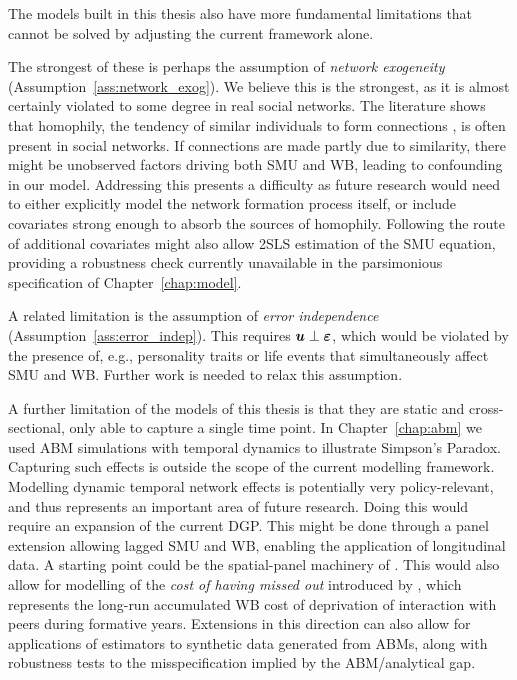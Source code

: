 The models built in this thesis also have more fundamental limitations that cannot be solved by adjusting the current framework alone.

The strongest of these is perhaps the assumption of \emph{network exogeneity} (Assumption~\ref{ass:network_exog}). We believe this is the strongest, as it is almost certainly violated to some degree in real social networks. The literature shows that homophily, the tendency of similar individuals to form connections \parencite{McPherson2001}, is often present in social networks. If connections are made partly due to similarity, there might be unobserved factors driving both SMU and WB, leading to confounding in our model. Addressing this presents a difficulty as future research would need to either explicitly model the network formation process itself, or include covariates strong enough to absorb the sources of homophily. Following the route of additional covariates might also allow 2SLS estimation of the SMU equation, providing a robustness check currently unavailable in the parsimonious specification of Chapter~\ref{chap:model}.

A related limitation is the assumption of \emph{error independence} (Assumption~\ref{ass:error_indep}). This requires $\bm{u} \perp \bm{\varepsilon}$, which would be violated by the presence of, e.g., personality traits or life events that simultaneously affect SMU and WB\@. Further work is needed to relax this assumption.

A further limitation of the models of this thesis is that they are static and cross-sectional, only able to capture a single time point. In Chapter~\ref{chap:abm} we used ABM simulations with temporal dynamics to illustrate Simpson's Paradox. Capturing such effects is outside the scope of the current modelling framework. Modelling dynamic temporal network effects is potentially very policy-relevant, and thus represents an important area of future research. Doing this would require an expansion of the current DGP\@. This might be done through a panel extension allowing lagged SMU and WB, enabling the application of longitudinal data. A starting point could be the spatial-panel machinery of \textcite{LeeYu2010}. This would also allow for modelling of the \emph{cost of having missed out} introduced by \textcite{DahlFoldnesGronneberg2026}, which represents the long-run accumulated WB cost of deprivation of interaction with peers during formative years. Extensions in this direction can also allow for applications of estimators to synthetic data generated from ABMs, along with robustness tests to the misspecification implied by the ABM/analytical gap.

